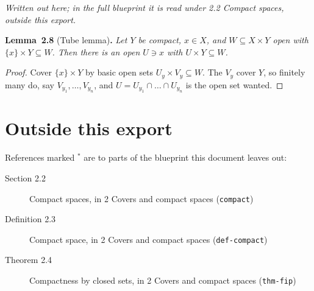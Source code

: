 \documentclass[11pt]{article}
\newenvironment{bpstatement}[2]{\par\addvspace{0.6\baselineskip}\noindent\textbf{#1}#2\textbf{.}\enspace\ignorespaces}
  {\par\addvspace{0.4\baselineskip}}
\newenvironment{bpstatementit}[2]{\begin{bpstatement}{#1}{#2}\itshape\ignorespaces}{\end{bpstatement}}
\newenvironment{bpnote}{\par\small\color{bpmuted}\itshape}{\par}
\newcommand{\bpslug}[1]{\texttt{#1}}
\begin{document}
\label{bp4}%
\begin{bpnote}Written out here; in the full blueprint it is read under 2.2 Compact spaces, outside this export.\end{bpnote}
\begin{bpstatementit}{Lemma~2.8}{ (Tube lemma)}
Let \(Y\) be compact, \(x \in X\), and \(W \subseteq X \times Y\) open with \(\{x\} \times Y \subseteq W\).  Then there is an open \(U \ni x\) with \(U \times Y \subseteq W\).
\end{bpstatementit}
\begin{proof}[{Proof}]\label{bp5}%
Cover \(\{x\} \times Y\) by basic open sets \(U_y \times V_y \subseteq W\).  The \(V_y\) cover \(Y\), so finitely many do, say \(V_{y_1}, \dots, V_{y_n}\), and \(U = U_{y_1} \cap \dots \cap U_{y_n}\) is the open set wanted.
\end{proof}


\clearpage{}\hypertarget{bp-outside}{}%
\section*{Outside this export}
References marked \ensuremath{{}^\ast} are to parts of the blueprint this document leaves out:
\begin{description}
\item[Section 2.2] Compact spaces, in 2 Covers and compact spaces (\bpslug{compact})
\item[Definition 2.3] Compact space, in 2 Covers and compact spaces (\bpslug{def-{}\allowbreak{}compact})
\item[Theorem 2.4] Compactness by closed sets, in 2 Covers and compact spaces (\bpslug{thm-{}\allowbreak{}fip})
\end{description}
\end{document}
